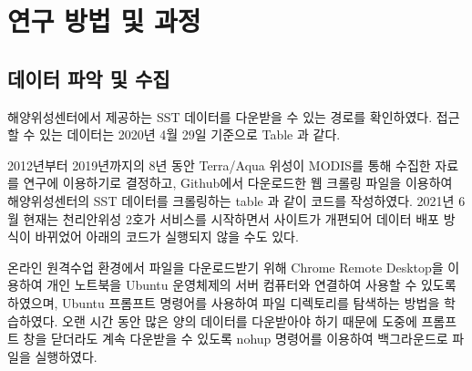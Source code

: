 \section{연구 방법 및 과정}

\subsection{데이터 파악 및 수집}

해양위성센터에서 제공하는 SST 데이터를 다운받을 수 있는 경로를 확인하였다. 접근할 수 있는 데이터는 2020년 4월 29일 기준으로 Table 과 같다.

2012년부터 2019년까지의 8년 동안 Terra/Aqua 위성이 MODIS를 통해 수집한 자료를 연구에 이용하기로 결정하고, Github에서 다운로드한 웹 크롤링 파일을 이용하여 해양위성센터의 SST 데이터를 크롤링하는 table 과 같이 코드를 작성하였다. 2021년 6월 현재는 천리안위성 2호가 서비스를 시작하면서 사이트가 개편되어 데이터 배포 방식이 바뀌었어 아래의 코드가 실행되지 않을 수도 있다.

온라인 원격수업 환경에서 파일을 다운로드받기 위해 Chrome Remote Desktop을 이용하여 개인 노트북을 Ubuntu 운영체제의 서버 컴퓨터와 연결하여 사용할 수 있도록 하였으며, Ubuntu 프롬프트 명령어를 사용하여 파일 디렉토리를 탐색하는 방법을 학습하였다. 오랜 시간 동안 많은 양의 데이터를 다운받아야 하기 때문에 도중에 프롬프트 창을 닫더라도 계속 다운받을 수 있도록 nohup 명령어를 이용하여 백그라운드로 파일을 실행하였다. 

